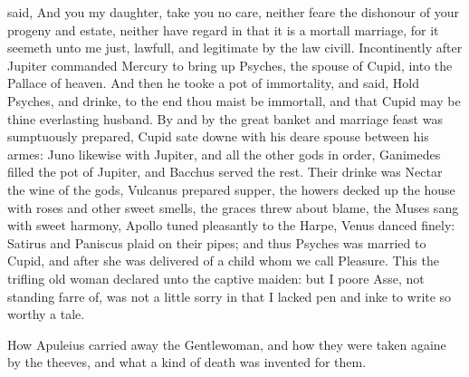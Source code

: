 said, And you my daughter, take you no care, neither feare the dishonour of
your progeny and estate, neither have regard in that it is a mortall marriage,
for it seemeth unto me just, lawfull, and legitimate by the law civill.
Incontinently after Jupiter commanded Mercury to bring up Psyches, the spouse
of Cupid, into the Pallace of heaven. And then he tooke a pot of immortality,
and said, Hold Psyches, and drinke, to the end thou maist be immortall, and
that Cupid may be thine everlasting husband. By and by the great banket and
marriage feast was sumptuously prepared, Cupid sate downe with his deare spouse
between his armes: Juno likewise with Jupiter, and all the other gods in order,
Ganimedes filled the pot of Jupiter, and Bacchus served the rest. Their drinke
was Nectar the wine of the gods, Vulcanus prepared supper, the howers decked up
the house with roses and other sweet smells, the graces threw about blame, the
Muses sang with sweet harmony, Apollo tuned pleasantly to the Harpe, Venus
danced finely: Satirus and Paniscus plaid on their pipes; and thus Psyches was
married to Cupid, and after she was delivered of a child whom we call Pleasure.
This the trifling old woman declared unto the captive maiden: but I poore Asse,
not standing farre of, was not a little sorry in that I lacked pen and inke to
write so worthy a tale.



How Apuleius carried away the Gentlewoman, and how they were taken againe by
the theeves, and what a kind of death was invented for them.

